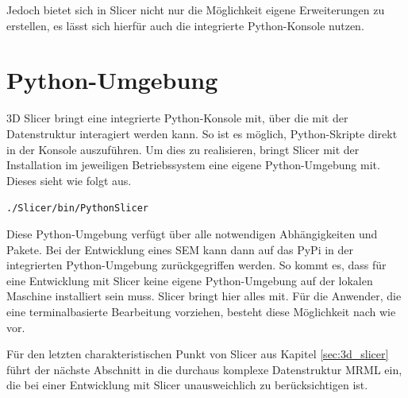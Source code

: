 Jedoch bietet sich in Slicer nicht nur die Möglichkeit eigene Erweiterungen zu erstellen,
es lässt sich hierfür auch die integrierte Python-Konsole nutzen.

\section{Python-Umgebung}
\label{subsec:pythob_umgebung} 3D Slicer bringt eine integrierte Python-Konsole
mit, über die mit der Datenstruktur interagiert werden kann. So ist es möglich, Python-Skripte
direkt in der Konsole auszuführen. Um dies zu realisieren, bringt Slicer mit der
Installation im jeweiligen Betriebssystem eine eigene Python-Umgebung mit.
Dieses sieht wie folgt aus.

\begin{center}
	\texttt{./Slicer/bin/PythonSlicer}
\end{center}

Diese Python-Umgebung verfügt über alle notwendigen Abhängigkeiten und Pakete.
Bei der Entwicklung eines \ac{SEM} kann dann auf das \ac{PyPi} in der
integrierten Python-Umgebung zurückgegriffen werden. So kommt es, dass für eine
Entwicklung mit Slicer keine eigene Python-Umgebung auf der lokalen Maschine
installiert sein muss. Slicer bringt hier alles mit. Für die Anwender, die eine terminalbasierte
Bearbeitung vorziehen, besteht diese Möglichkeit nach wie vor.

Für den letzten charakteristischen Punkt von Slicer aus Kapitel
\ref{sec:3d_slicer} führt der nächste Abschnitt in die durchaus komplexe
Datenstruktur \ac{MRML} ein, die bei einer Entwicklung mit Slicer unausweichlich
zu berücksichtigen ist.

